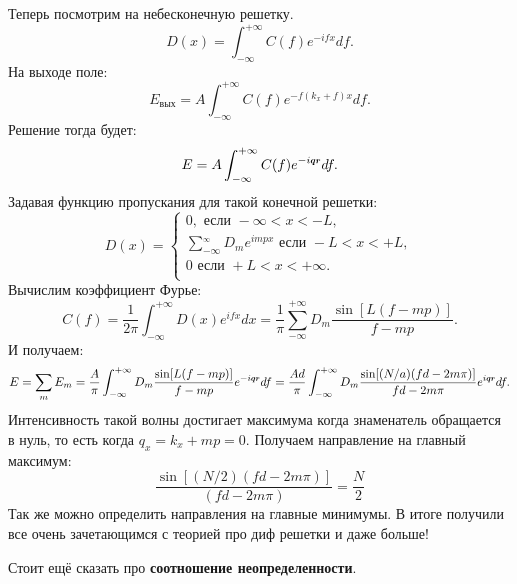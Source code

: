 Теперь посмотрим на небесконечную решетку.
\begin{equation*}
	D(x) = \int_{-\infty}^{+\infty} C(f) e^{-i f x} d f.
\end{equation*}
На выходе поле:
\begin{equation*}
	E_\text{вых} = A \int_{-\infty}^{+\infty} C(f) e^{-f(k_x +f)x}d f.
\end{equation*}
Решение тогда будет:
\begin{equation*}
	E = A \int_{-\infty}^{+\infty} C(f) e^{- i \smallvc{q} \smallvc{r}} d f.
\end{equation*}
Задавая функцию пропускания для такой конечной решетки:
\begin{equation*}
	D(x) =\left\{
	\begin{aligned}
		0, \text{ если } -\infty < x < - L,\\
		\sum_{-\infty}^{_\infty} D_m e^{i m p x}\text{ если } - L < x < + L,\\
		0\text{ если } + L < x < +\infty.\\
	\end{aligned}
	\right.
\end{equation*}
Вычислим коэффициент Фурье:
\begin{equation*}
	C(f) = \frac{1}{2 \pi} \int_{- \infty}^{+\infty} D(x) e^{i f x} dx = \frac{1}{\pi} \sum_{-\infty}^{+\infty} D_m \frac{\sin[L (f - mp)]}{f - mp}.
\end{equation*}
И получаем:
\begin{equation*}
	E = \sum_m E_m = \frac{A}{\pi} \int_{-\infty}^{+\infty} D_m \frac{\sin[L(f-mp)]}{f - mp}e^{-i \smallvc{q} \smallvc{r}} d f = \frac{A d}{\pi} \int_{-\infty}^{+\infty} D_m \frac{\sin[(N/a)(f d - 2 m \pi)]}{f d - 2m \pi}e^{i \smallvc{q} \smallvc{r}} d f.
\end{equation*}
Интенсивность такой волны достигает максимума когда знаменатель обращается в нуль, то есть когда $q_x = k_x + mp = 0$. Получаем направление на главный максимум:
\begin{equation*}
	\frac{\sin [(N/2)(fd - 2 m\pi)]}{(f d - 2 m \pi)} = \frac{N}{2}
\end{equation*}
Так же можно определить направления на главные минимумы. В итоге получили все очень зачетающимся с теорией про диф решетки и даже больше!

Стоит ещё сказать про \textbf{соотношение неопределенности}.

